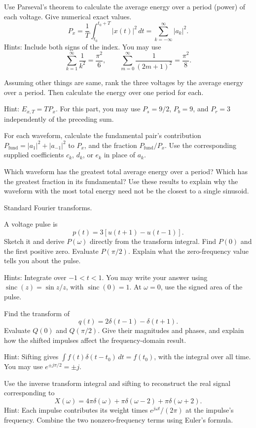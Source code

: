 \documentclass{ee102_pset}
\begin{document}
\problempart[5 points] Use Parseval's theorem to calculate the average
energy over a period (power) of each voltage. Give numerical exact values.
\[
P_x=\frac{1}{T}\int_{t_0}^{t_0+T}|x(t)|^2\,dt
=\sum_{k=-\infty}^{\infty}|a_k|^2.
\]
Hints: Include both signs of the index. You may use
\[
\sum_{k=1}^{\infty}\frac{1}{k^2}=\frac{\pi^2}{6},
\qquad
\sum_{m=0}^{\infty}\frac{1}{(2m+1)^2}=\frac{\pi^2}{8}.
\]

\problempart[3 points] Assuming other things are same, rank the three voltages by the average energy over a period.
Then calculate the energy over one period for each.

Hint: $E_{x,T}=T P_x$. For this part, you may use
$P_s=9/2$, $P_b=9$, and $P_r=3$ independently of the preceding sum.

\problempart[4 points] For each waveform, calculate the fundamental pair's
contribution $P_{\mathrm{fund}}=|a_1|^2+|a_{-1}|^2$ to $P_x$, and the
fraction $P_{\mathrm{fund}}/P_x$. Use the corresponding supplied coefficients
$c_k$, $d_k$, or $e_k$ in place of $a_k$.

\problempart[3 points] Which waveform has the greatest total average
energy over a period? Which has the greatest fraction in its fundamental?
Use these results to explain why the waveform with the most total energy
need not be the closest to a single sinusoid.


 Standard Fourier transforms.

\problempart[10 points] A voltage pulse is
\[
p(t)=3[u(t+1)-u(t-1)].
\]
Sketch it and derive $P(\omega)$ directly from the transform integral.
Find $P(0)$ and the first positive zero. Evaluate $P(\pi/2)$.
Explain what the zero-frequency value tells you about the pulse.

Hints: Integrate over $-1<t<1$. You may write your answer using
$\operatorname{sinc}(z)=\sin z/z$, with $\operatorname{sinc}(0)=1$.
At $\omega=0$, use the signed area of the pulse.

\problempart[5 points] Find the transform of
\[
q(t)=2\delta(t-1)-\delta(t+1).
\]
Evaluate $Q(0)$ and $Q(\pi/2)$. Give their magnitudes and phases,
and explain how the shifted impulses affect the frequency-domain result.

Hint: Sifting gives
$\int f(t)\delta(t-t_0)\,dt=f(t_0)$, with the integral over all time.
You may use $e^{\pm j\pi/2}=\pm j$.

\problempart[5 points] Use the inverse transform integral and sifting
to reconstruct the real signal corresponding to
\[
X(\omega)=4\pi\delta(\omega)
+\pi\delta(\omega-2)+\pi\delta(\omega+2).
\]
Hint: Each impulse contributes its weight times
$e^{j\omega t}/(2\pi)$ at the impulse's frequency. Combine the two
nonzero-frequency terms using Euler's formula.
\end{document}
